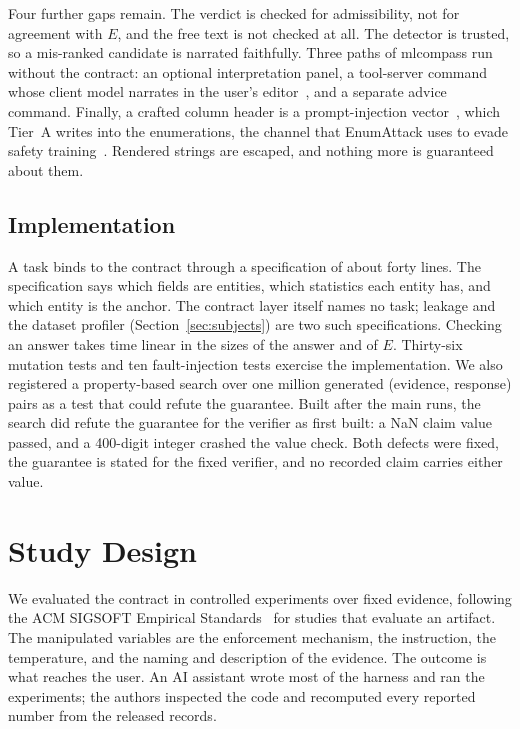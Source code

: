 \documentclass[journal]{IEEEtran}
\begin{document}
Four further gaps remain. The verdict is checked for admissibility, not for
agreement with $E$, and the free text is not checked at all. The detector is
trusted, so a mis-ranked candidate is narrated faithfully. Three paths of
mlcompass run without the contract: an optional interpretation panel, a
tool-server command whose client model narrates in the user's
editor~\cite{mcp}, and a separate advice command. Finally, a crafted column
header is a prompt-injection vector~\cite{greshake2023injection}, which Tier~A
writes into the enumerations, the channel that EnumAttack uses to evade safety
training~\cite{zhang2025cda}. Rendered strings are escaped, and nothing more is
guaranteed about them.

\subsection{Implementation}

A task binds to the contract through a specification of about forty lines. The
specification says which fields are entities, which statistics each entity has,
and which entity is the anchor. The contract layer itself names no task; leakage
and the dataset profiler (Section~\ref{sec:subjects}) are two such
specifications. Checking an answer takes time linear in the sizes of the answer
and of $E$. Thirty-six mutation tests and ten fault-injection tests exercise the
implementation. We also registered a property-based search over one million generated
(evidence, response) pairs as a test that could refute the guarantee. Built after
the main runs, the search did refute the guarantee for the verifier as first
built: a NaN claim value passed, and a 400-digit integer crashed the value
check. Both defects were fixed, the guarantee is stated for the fixed verifier,
and no recorded claim carries either value.

\section{Study Design}\label{sec:design}

We evaluated the contract in controlled experiments over fixed evidence,
following the ACM SIGSOFT Empirical Standards~\cite{ralph2020standards} for
studies that evaluate an artifact. The manipulated variables are the enforcement
mechanism, the instruction, the temperature, and the naming and description of
the evidence. The outcome is what reaches the user. An AI assistant wrote most of
the harness and ran the experiments; the authors inspected the code and
recomputed every reported number from the released records.
\end{document}
